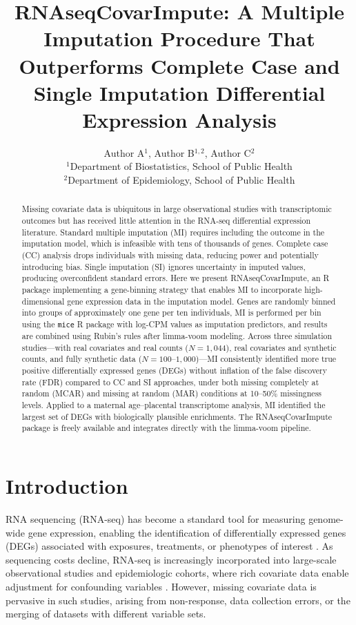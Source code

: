 \documentclass[11pt]{article}
\title{RNAseqCovarImpute: A Multiple Imputation Procedure That Outperforms Complete Case and Single Imputation Differential Expression Analysis}
\author{Author A$^{1}$, Author B$^{1,2}$, Author C$^{2}$ \\
\small $^{1}$Department of Biostatistics, School of Public Health \\
\small $^{2}$Department of Epidemiology, School of Public Health}
\date{}
\begin{document}
\maketitle

\begin{abstract}
Missing covariate data is ubiquitous in large observational studies with transcriptomic outcomes but has received little attention in the RNA-seq differential expression literature. Standard multiple imputation (MI) requires including the outcome in the imputation model, which is infeasible with tens of thousands of genes. Complete case (CC) analysis drops individuals with missing data, reducing power and potentially introducing bias. Single imputation (SI) ignores uncertainty in imputed values, producing overconfident standard errors. Here we present RNAseqCovarImpute, an R package implementing a gene-binning strategy that enables MI to incorporate high-dimensional gene expression data in the imputation model. Genes are randomly binned into groups of approximately one gene per ten individuals, MI is performed per bin using the \texttt{mice} R package with log-CPM values as imputation predictors, and results are combined using Rubin's rules after limma-voom modeling. Across three simulation studies---with real covariates and real counts ($N = 1{,}044$), real covariates and synthetic counts, and fully synthetic data ($N = 100$--$1{,}000$)---MI consistently identified more true positive differentially expressed genes (DEGs) without inflation of the false discovery rate (FDR) compared to CC and SI approaches, under both missing completely at random (MCAR) and missing at random (MAR) conditions at 10--50\% missingness levels. Applied to a maternal age--placental transcriptome analysis, MI identified the largest set of DEGs with biologically plausible enrichments. The RNAseqCovarImpute package is freely available and integrates directly with the limma-voom pipeline.
\end{abstract}

\section{Introduction}

RNA sequencing (RNA-seq) has become a standard tool for measuring genome-wide gene expression, enabling the identification of differentially expressed genes (DEGs) associated with exposures, treatments, or phenotypes of interest \citep{conesa2016,love2014}. As sequencing costs decline, RNA-seq is increasingly incorporated into large-scale observational studies and epidemiologic cohorts, where rich covariate data enable adjustment for confounding variables \citep{hutter2019}. However, missing covariate data is pervasive in such studies, arising from non-response, data collection errors, or the merging of datasets with different variable sets.
\end{document}
